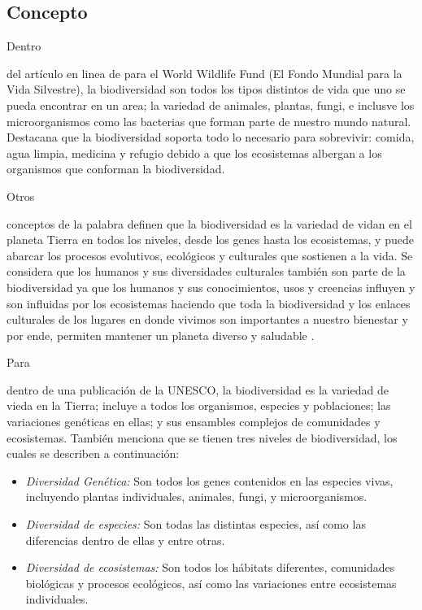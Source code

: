 \documentclass[stu, 12pt, letterpaper, donotrepeattitle, floatsintext, natbib]{apa7}
\begin{document}
\subsection{Concepto}
Dentro \begin{justifying}
    del artículo en linea de \cite{hancock-no-date} para el World Wildlife Fund (El Fondo Mundial para la Vida Silvestre), 
    la biodiversidad son todos los tipos distintos de vida que uno se pueda encontrar en un area; la variedad de animales,
    plantas, fungi, e inclusve los microorganismos como las bacterias que forman parte de nuestro mundo natural. Destacana que 
    la biodiversidad soporta todo lo necesario para sobrevivir: comida, agua limpia, medicina y refugio debido a que los ecosistemas
    albergan a los organismos que conforman la biodiversidad.\par
\end{justifying}
Otros \begin{justifying}
    conceptos de la palabra definen que la biodiversidad es la variedad de vidan en el planeta Tierra en todos los niveles,
    desde los genes hasta los ecosistemas, y puede abarcar los procesos evolutivos, ecológicos y culturales que sostienen a la vida.
    Se considera que los humanos y sus diversidades culturales también son parte de la biodiversidad ya que los humanos y sus conocimientos,
    usos y creencias influyen y son influidas por los ecosistemas haciendo que toda la biodiversidad y los enlaces culturales de los lugares en donde
    vivimos son importantes a nuestro bienestar y por ende, permiten mantener un planeta diverso y saludable \citep{american-museum-of-natural-history-no-date}.\par%
\end{justifying}
Para \begin{justifying}
    \cite{benn-2010} dentro de una publicación de la UNESCO, %
    la biodiversidad es la variedad de vieda en la Tierra; incluye a todos los organismos, especies y poblaciones; las variaciones genéticas
    en ellas; y sus ensambles complejos de comunidades y ecosistemas. También menciona que se tienen tres niveles de biodiversidad, los cuales se describen
    a continuación:
    \begin{itemize}
        \item \emph{Diversidad Genética:} Son todos los genes contenidos en las especies vivas, incluyendo plantas individuales, animales, fungi, y microorganismos.
        \item \emph{Diversidad de especies:} Son todas las distintas especies, así como las diferencias dentro de ellas y entre otras.
        \item \emph{Diversidad de ecosistemas:} Son todos los hábitats diferentes, comunidades biológicas y procesos ecológicos, así como las variaciones entre ecosistemas individuales.
    \end{itemize}\par
\end{justifying}
\vspace{\baselineskip}
\end{document}
